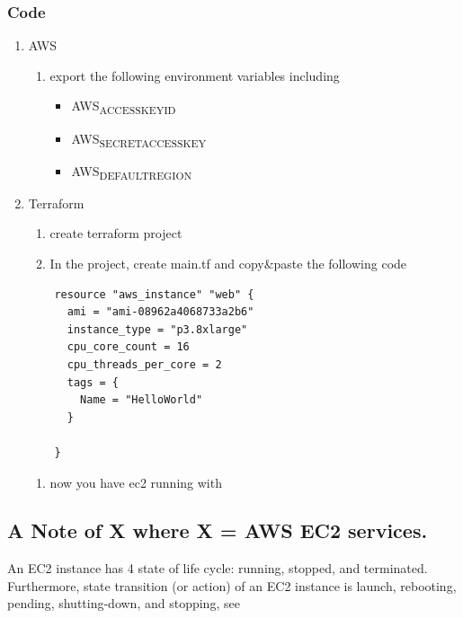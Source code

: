 \documentclass[11pt]{article}
\begin{document}
\subsubsection{Code}
\label{code}
\begin{enumerate}
\item AWS
\label{aws}
\begin{enumerate}
\item export the following environment variables including

\begin{itemize}
\item AWS\textsubscript{ACCESS}\textsubscript{KEY}\textsubscript{ID}
\item AWS\textsubscript{SECRET}\textsubscript{ACCESS}\textsubscript{KEY}
\item AWS\textsubscript{DEFAULT}\textsubscript{REGION}
\end{itemize}
\end{enumerate}

\item Terraform
\label{terraform}
\begin{enumerate}
\item create terraform project
\item In the project, create main.tf and copy\&paste the following code
\end{enumerate}

\begin{verbatim}
    resource "aws_instance" "web" {
      ami = "ami-08962a4068733a2b6"
      instance_type = "p3.8xlarge"
      cpu_core_count = 16
      cpu_threads_per_core = 2
      tags = {
        Name = "HelloWorld"
      }

    }
\end{verbatim}

\begin{enumerate}
\item now you have ec2 running with
\end{enumerate}
\end{enumerate}
\subsection{A Note of X where X = AWS EC2 services.}
\label{sec:org4aa7dbf}
An EC2 instance has 4 state of life cycle: running, stopped, and terminated. Furthermore, state transition (or action) of an EC2 instance is launch, rebooting, pending, shutting-down, and stopping, see
\end{document}
